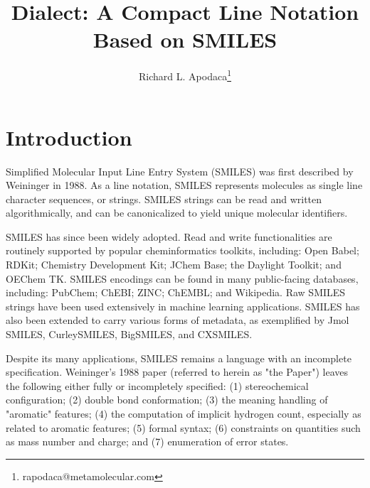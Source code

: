 \documentclass{article}
\begin{document}
\lstset{basicstyle=\ttfamily,breaklines=true}


\title{Dialect: A Compact Line Notation Based on SMILES}
\author{Richard L. Apodaca\thanks{rapodaca@metamolecular.com}}

\maketitle

\section*{Introduction}

Simplified Molecular Input Line Entry System (SMILES) was first described by Weininger in 1988.\cite{weininger:1988} As a line notation,\cite{wiswesser:1968} SMILES represents molecules as single line character sequences, or strings. SMILES strings can be read and written algorithmically, and can be canonicalized\cite{weininger:1989,oBoyle:2012} to yield unique molecular identifiers.

SMILES has since been widely adopted. Read and write functionalities are routinely supported by popular cheminformatics toolkits, including: Open Babel;\cite{oBoyle:2011} RDKit;\cite{rdkit} Chemistry Development Kit;\cite{steinbeck:2003} JChem Base;\cite{jchemBase} the Daylight Toolkit;\cite{daylightToolkit} and OEChem TK.\cite{oetk} SMILES encodings can be found in many public-facing databases, including: PubChem;\cite{kim:2016} ChEBI;\cite{degtyarenko:2007} ZINC;\cite{irwin:2005} ChEMBL;\cite{gaulton:2012} and Wikipedia.\cite{wikipediaCAS} Raw SMILES strings have been used extensively in machine learning applications.\cite{sousa:2021} SMILES has also been extended to carry various forms of metadata, as exemplified by Jmol SMILES,\cite{hanson:2016} CurleySMILES,\cite{drefahl:2011} BigSMILES,\cite{lin:2019} and CXSMILES.\cite{cxsmiles}

Despite its many applications, SMILES remains a language with an incomplete specification. Weininger's 1988 paper (referred to herein as "the Paper") leaves the following either fully or incompletely specified: (1) stereochemical configuration; (2) double bond conformation; (3) the meaning handling of "aromatic" features; (4) the computation of implicit hydrogen count, especially as related to aromatic features; (5) formal syntax; (6) constraints on quantities such as mass number and charge; and (7) enumeration of error states.
\end{document}
